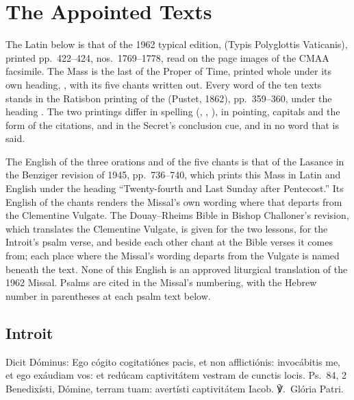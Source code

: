 \section{The Appointed Texts}
\label{sec:appointed-texts}

The Latin below is that of the 1962 typical edition, 
(Typis Polyglottis Vaticanis), printed pp.~422--424, nos.~1769--1778, read on
the page images of the CMAA facsimile. The Mass is the last of the Proper of
Time, printed whole under its own heading, , with its five chants written out. Every word of the
ten texts stands in the Ratisbon printing of the 
(Pustet, 1862), pp.~359--360, under the heading . The two printings differ in spelling
(, , ), in pointing,
capitals and the form of the citations, and in the Secret's conclusion cue,
and in no word that is said.

The English of the three orations and of the five chants is that of the
Lasance  in the Benziger revision of 1945, pp.~736--740,
which prints this Mass in Latin and English under the heading ``Twenty-fourth
and Last Sunday after Pentecost.'' Its English of the chants renders the
Missal's own wording where that departs from the Clementine Vulgate. The
Douay--Rheims Bible in Bishop Challoner's revision, which translates the
Clementine Vulgate, is given for the two lessons, for the Introit's psalm
verse, and beside each other chant at the Bible verses it comes from; each
place where the Missal's wording departs from the Vulgate is named beneath
the text. None of this English is an approved liturgical translation of the
1962 Missal. Psalms are cited in the Missal's numbering, with the Hebrew
number in parentheses at each psalm text below.

\subsection{Introit}
\label{proper-introit}


\begin{latinproper}
Dicit Dóminus: Ego cógito cogitatiónes pacis, et non afflictiónis:
invocábitis me, et ego exáudiam vos: et redúcam captivitátem vestram de
cunctis locis. \textnormal{Ps.\ 84, 2} Benedixísti, Dómine, terram tuam:
avertísti captivitátem Iacob. ℣.~Glória Patri.
\end{latinproper}

